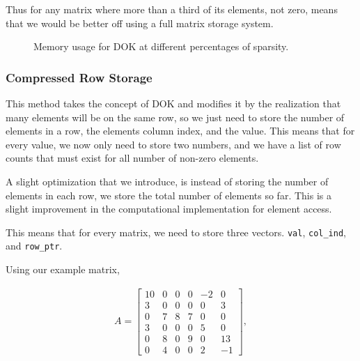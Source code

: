 \documentclass[../fem.tex]{subfile}
\begin{document}
Thus for any matrix where more than a third of its elements, not zero, means
that we would be better off using a full matrix storage system.

\begin{figure}[htpb]
  \centering
  \caption{Memory usage for DOK at different percentages of sparsity.}
  \label{fig:mat_dok}
\end{figure}

\subsubsection{Compressed Row Storage}%
\label{ssub:compressed_row_storage}

This method takes the concept of DOK and modifies it by the realization that
many elements will be on the same row, so we just need to store the number of
elements in a row, the elements column index, and the value. This means that
for every value, we now only need to store two numbers, and we have a list of
row counts that must exist for all number of non-zero elements.

A slight optimization that we introduce, is instead of storing the number of
elements in each row, we store the total number of elements so far. This is a
slight improvement in the computational implementation for element access.

This means that for every matrix, we need to store three vectors.
\texttt{val}, \texttt{col_ind}, and
\texttt{row_ptr}.

Using our example matrix,

\begin{align*}
  A = \begin{bmatrix}
    10 & 0 & 0 & 0 & -2 & 0 \\
    3 & 0 & 0 & 0 & 0 & 3 \\
    0 & 7 & 8 & 7 & 0 & 0 \\
    3 & 0 & 0 & 0 & 5 & 0 \\
    0 & 8 & 0 & 9 & 0 & 13 \\
    0 & 4 & 0 & 0 & 2 & -1
  \end{bmatrix},
\end{align*}
\end{document}
